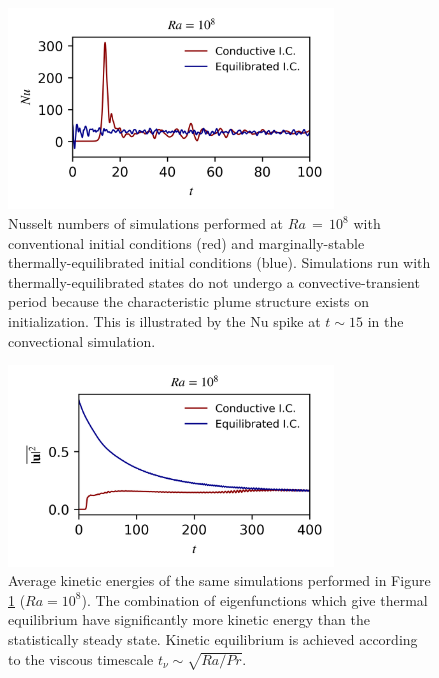 \documentclass[reprint,amsmath,amssymb,aps]{revtex4-1}
\newcommand\Nu{\mathrm{Nu}}
\begin{document}
\begin{figure}
    \begin{minipage}{3.4in}
        \centering
        \includegraphics[width=3.4in]{sim_eq_nu.png}
        \caption{Nusselt numbers of simulations performed at $Ra \, = \, 10^8$ with conventional initial conditions (red) and marginally-stable thermally-equilibrated initial conditions (blue). 
        Simulations run with thermally-equilibrated states do not undergo a convective-transient period because the characteristic plume structure exists on initialization. 
        This is illustrated by the $\Nu$ spike at $t \sim 15$ in the convectional simulation.}
        \label{fig:nu_sim}
    \end{minipage}
\end{figure}

\begin{figure}
    \begin{minipage}{3.4in}
        \centering
        \includegraphics[width=3.4in]{sim_eq_ke.png}
        \caption{Average kinetic energies of the same simulations performed in Figure \ref{fig:nu_sim} ($Ra = 10^8$). 
        The combination of eigenfunctions which give thermal equilibrium have significantly more kinetic energy than the statistically steady state. 
        Kinetic equilibrium is achieved according to the viscous timescale $t_{\nu} \sim \sqrt{Ra / Pr}$.}
        \label{fig:ke_sim}
    \end{minipage}
\end{figure}
\end{document}
